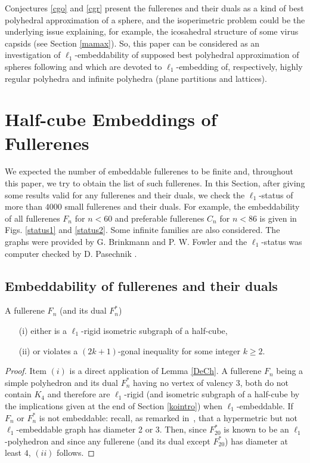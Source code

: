 Conjectures \ref{cgo} and \ref{cgr} present the fullerenes and their duals as a kind of
best polyhedral approximation of a sphere, and the isoperimetric problem
could be the underlying issue explaining, for example,
the icosahedral structure of some virus capsids (see Section \ref{mamax}). So, this paper can
be considered as an
investigation of $\ell_1$-embeddability of supposed best polyhedral
approximation of spheres following
\cite{dg96} and \cite{ds00} which are  devoted to $\ell_1$-embedding of, respectively,  highly
regular polyhedra and infinite polyhedra (plane partitions and lattices).


\newpage
\section{Half-cube Embeddings of Fullerenes}
We expected the number of embeddable fullerenes to be finite and, throughout this paper,
we try to obtain the list of such fullerenes. In this Section, 
after giving some results valid for any fullerenes and 
their duals, we check the $\ell_1$-status of more than $4000$
small fullerenes and their duals. For example, the embeddability of all 
fullerenes $F_n$ for $n<60$ and preferable fullerenes $C_n$ for $n<86$ is given 
in Figs. \ref{status1} and \ref{status2}. Some infinite families
are also considered.  
The graphs were provided by {\sc G. Brinkmann} and {P. W. Fowler}
and the $\ell_1$-status was computer checked by {\sc D. Pasechnik} \cite{dima}.

\subsection{Embeddability of fullerenes and their duals}\label{sec1}
\begin{lemma}\label{cjepp}
A fullerene $F_n$ (and its dual $F^*_n$)
\begin{itemize} 
\item[(i)] either is a $\ell_1$-rigid isometric subgraph of a half-cube,
\item[(ii)] or violates a $(2k+1)$-gonal inequality for some integer $k\geq 2$.
\end{itemize}
\begin{proof} Item $(i)$ is a direct application of Lemma \ref{DeCh}. A fullerene $F_n$ being
a simple polyhedron and its dual $F^*_n$ having no vertex of valency $3$, both do not contain
$K_4$ and therefore are $\ell_1$-rigid (and isometric subgraph of a half-cube
by the implications given at the end of Section \ref{kointro}) when $\ell_1$-embeddable.
If $F_n$ or $F^*_n$ is not embeddable: recall, as remarked in~\cite{dg93},
that a hypermetric but not $\ell_1$-embeddable
graph has diameter 2 or 3. Then, since $F^*_{20}$ is known to be an $\ell_1$-polyhedron and since any fullerene 
(and its dual except $F^*_{20}$) has diameter at least $4$, $(ii)$ follows.
\end{proof}
\end{lemma}

